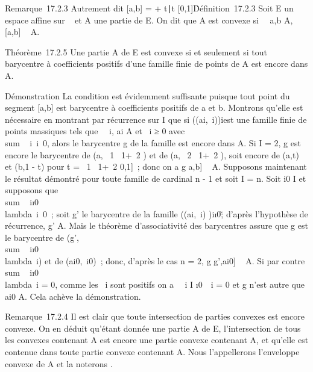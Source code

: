 Remarque~17.2.3 Autrement dit {[}a,b{]} = \a +
t\overrightarrowab∣t \in
{[}0,1{]}\.

Définition~17.2.3 Soit E un espace affine sur ~ et A une partie de E. On
dit que A est convexe si \forall~~a,b \in A, {[}a,b{]} \subset~
A.

Théorème~17.2.5 Une partie A de E est convexe si et seulement si tout
barycentre à coefficients positifs d'une famille finie de points de A
est encore dans A.

Démonstration La condition est évidemment suffisante puisque tout point
du segment {[}a,b{]} est barycentre à coefficients positifs de a et b.
Montrons qu'elle est nécessaire en montrant par récurrence sur
\textbar{}I\textbar{} que si \left
((ai,\lambda~i)\right )i\inI est une
famille finie de points massiques tels que \forall~~i,
ai \in A et \lambda~i ≥ 0 avec
\\sum ~
i\inI\lambda~i\neq~0, alors le
barycentre g de la famille est encore dans A. Si \textbar{}I\textbar{} =
2, g est encore le barycentre de (a, \lambda~1 \over
\lambda~1+\lambda~2 ) et de (a, \lambda~2
\over \lambda~1+\lambda~2 ), soit encore de (a,t)
et (b,1 - t) pour t = \lambda~1 \over
\lambda~1+\lambda~2 \in {[}0,1{]}~; donc on a g \in {[}a,b{]} \subset~ A.
Supposons maintenant le résultat démontré pour toute famille de cardinal
n - 1 et soit \textbar{}I\textbar{} = n. Soit i0 \in I et
supposons que \\sum ~
i\inI\diagdown\i0\\lambda~i\neq~0~;
soit g' le barycentre de la famille \left
((ai,\lambda~i)\right
)i\inI\diagdown\i0\~; d'après
l'hypothèse de récurrence, g' \in A. Mais le théorème d'associativité des
barycentres assure que g est le barycentre de
(g',\\sum ~
i\inI\diagdown\i0\\lambda~i)
et de (ai0,\lambda~i0)~; donc, d'après
le cas n = 2, g \in {[}g',ai0{]} \subset~ A. Si par contre
\\sum ~
i\inI\diagdown\i0\\lambda~i
= 0, comme les \lambda~i sont positifs on a
\forall~~i \in I
\diagdown\i0\, \lambda~i = 0 et g
n'est autre que ai0 \in A. Cela achève la
démonstration.

Remarque~17.2.4 Il est clair que toute intersection de parties convexes
est encore convexe. On en déduit qu'étant donnée une partie A de E,
l'intersection de tous les convexes contenant A est encore une partie
convexe contenant A, et qu'elle est contenue dans toute partie convexe
contenant A. Nous l'appellerons l'enveloppe convexe de A et la noterons
\hatA.

